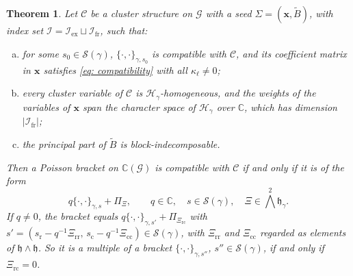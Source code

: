 \documentclass[a4paper]{amsart}
\numberwithin{equation}{section}
\newtheorem{theorem}{Theorem}[section]
\theoremstyle{definition}
\theoremstyle{remark}
\newcommand{\bbC}{\mathbb{C}}
\newcommand{\mfh}{\mathfrak{h}}
\newcommand{\mcG}{\mathcal{G}}
\newcommand{\mcH}{\mathcal{H}}
\newcommand{\mcC}{\mathcal{C}}
\newcommand{\mcS}{\mathcal{S}}
\newcommand{\mcI}{\mathcal{I}}
\newcommand{\bx}{\mathbf{x}}
\newcommand{\tB}{\widetilde{B}}
\newcommand{\rr}{\mathrm{r}}
\newcommand{\cc}{\mathrm{c}}
\newcommand{\ex}{\mathrm{ex}}
\newcommand{\fr}{\mathrm{fr}}
\newcommand{\toric}{\Pi}
\begin{document}
\begin{theorem}
  \label{thm: classification}
  Let $\mcC$ be a cluster structure on $\mcG$ with a seed $\Sigma=(\bx,\tB)$, with index set $\mcI=\mcI_\ex\sqcup\mcI_\fr$, such that:
  \begin{enumerate}[(a)]
    \item for some $s_0\in\mcS(\gamma)$, $\{\cdot,\cdot\}_{\gamma,s_0}$ is compatible with $\mcC$, and its coefficient matrix in $\bx$ satisfies \eqref{eq: compatibility} with all $\kappa_\ell\neq0$;
    \item every cluster variable of $\mcC$ is $\mcH_\gamma$-homogeneous, and the weights of the variables of $\bx$ span the character space of $\mcH_\gamma$ over $\bbC$, which has dimension $|\mcI_\fr|$;
    \item the principal part of $\tB$ is block-indecomposable.
  \end{enumerate}
  Then a Poisson bracket on $\bbC(\mcG)$ is compatible with $\mcC$ if and only if it is of the form
  \[
    q\{\cdot,\cdot\}_{\gamma,s}+\toric_\Xi,
    \qquad
    q\in\bbC,\quad s\in\mcS(\gamma),\quad \Xi\in\textstyle\bigwedge^2\mfh_\gamma.
  \]
  If $q\neq0$, the bracket equals $q\{\cdot,\cdot\}_{\gamma,s'}+\toric_{\Xi_\mathrm{rc}}$ with $s'=(s_{\rr}-q^{-1}\Xi_\mathrm{rr},\,s_{\cc}-q^{-1}\Xi_\mathrm{cc})\in\mcS(\gamma)$, with $\Xi_\mathrm{rr}$ and $\Xi_\mathrm{cc}$ regarded as elements of $\mfh\wedge\mfh$.
  So it is a multiple of a bracket $\{\cdot,\cdot\}_{\gamma,s''}$, $s''\in\mcS(\gamma)$, if and only if $\Xi_\mathrm{rc}=0$.
\end{theorem}
\end{document}

